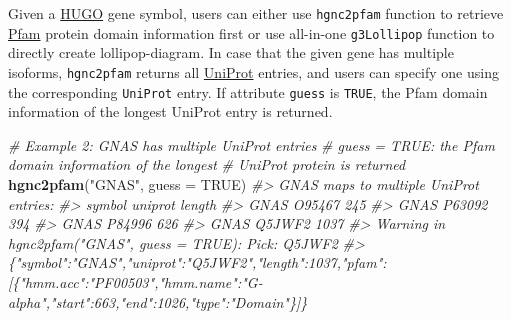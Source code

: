 \documentclass[
]{article}
\newenvironment{Shaded}{\begin{snugshade}}{\end{snugshade}}
\newcommand{\AttributeTok}[1]{\textcolor[rgb]{0.13,0.29,0.53}{#1}}
\newcommand{\CommentTok}[1]{\textcolor[rgb]{0.56,0.35,0.01}{\textit{#1}}}
\newcommand{\ConstantTok}[1]{\textcolor[rgb]{0.56,0.35,0.01}{#1}}
\newcommand{\FunctionTok}[1]{\textcolor[rgb]{0.13,0.29,0.53}{\textbf{#1}}}
\newcommand{\NormalTok}[1]{#1}
\newcommand{\StringTok}[1]{\textcolor[rgb]{0.31,0.60,0.02}{#1}}
\begin{document}
Given a \href{https://www.genenames.org/}{HUGO} gene symbol, users can
either use \texttt{hgnc2pfam} function to retrieve
\href{https://pfam.xfam.org/}{Pfam} protein domain information first or
use all-in-one \texttt{g3Lollipop} function to directly create
lollipop-diagram. In case that the given gene has multiple isoforms,
\texttt{hgnc2pfam} returns all \href{https://www.uniprot.org/}{UniProt}
entries, and users can specify one using the corresponding
\texttt{UniProt} entry. If attribute \texttt{guess} is \texttt{TRUE},
the Pfam domain information of the longest UniProt entry is returned.

\begin{Shaded}
\end{Shaded}

\begin{Shaded}
\begin{Highlighting}[]

\CommentTok{\# Example 2: GNAS has multiple UniProt entries}
\CommentTok{\#   \textasciigrave{}guess = TRUE\textasciigrave{}: the Pfam domain information of the longest }
\CommentTok{\#                   UniProt protein is returned}
\FunctionTok{hgnc2pfam}\NormalTok{(}\StringTok{"GNAS"}\NormalTok{, }\AttributeTok{guess =} \ConstantTok{TRUE}\NormalTok{)}
\CommentTok{\#\textgreater{} GNAS maps to multiple UniProt entries: }
\CommentTok{\#\textgreater{}  symbol uniprot length}
\CommentTok{\#\textgreater{}    GNAS  O95467    245}
\CommentTok{\#\textgreater{}    GNAS  P63092    394}
\CommentTok{\#\textgreater{}    GNAS  P84996    626}
\CommentTok{\#\textgreater{}    GNAS  Q5JWF2   1037}
\CommentTok{\#\textgreater{} Warning in hgnc2pfam("GNAS", guess = TRUE): Pick: Q5JWF2}
\CommentTok{\#\textgreater{} \{"symbol":"GNAS","uniprot":"Q5JWF2","length":1037,"pfam":[\{"hmm.acc":"PF00503","hmm.name":"G{-}alpha","start":663,"end":1026,"type":"Domain"\}]\}}
\end{Highlighting}
\end{Shaded}
\end{document}
